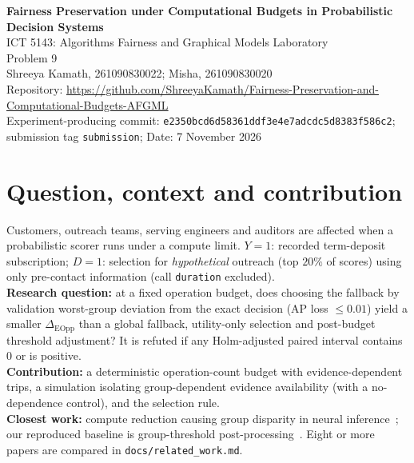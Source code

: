 \documentclass[11pt,a4paper]{article}
\newcommand{\ProjectTitle}{Fairness Preservation under Computational Budgets in Probabilistic Decision Systems}
\begin{document}
\begin{center}
{\Large\bfseries \ProjectTitle}\\[4pt]
ICT 5143: Algorithms Fairness and Graphical Models Laboratory\\
Problem 9\\
Shreeya Kamath, 261090830022; Misha, 261090830020\\
{\small Repository: \url{https://github.com/ShreeyaKamath/Fairness-Preservation-and-Computational-Budgets-AFGML}\\
Experiment-producing commit: \texttt{e2350bcd6d58361ddf3e4e7adcdc5d8383f586c2}; submission tag \texttt{submission}; Date: 7 November 2026}
\end{center}
\begin{abstract}
\noindent We ask whether a budget-aware fallback limits the fairness loss when exact inference in a nine-variable Bayesian network for pre-contact bank outreach is cut off by an operation budget. On UCI Bank Marketing (test $n=8{,}238$), fairness-aware fallback selection reproduces exact decisions (AP $0.421$, $98.3\%$ agreement) but has a larger $\Delta_{\mathrm{EOpp}}$ than the global fallback by $+0.120$ $[0.015,0.226]$; our hypothesis is refuted. Simulation shows group-dependent evidence availability drives fallback disparity. Limits: strong base-rate drift, no customer identifiers, small network.
\end{abstract}

\section{Question, context and contribution}
Customers, outreach teams, serving engineers and auditors are affected when a probabilistic scorer runs under a compute limit. $Y=1$: recorded term-deposit subscription; $D=1$: selection for \emph{hypothetical} outreach (top $20\%$ of scores) using only pre-contact information (call \texttt{duration} excluded).\\
\textbf{Research question:} at a fixed operation budget, does choosing the fallback by validation worst-group deviation from the exact decision (AP loss $\le0.01$) yield a smaller $\Delta_{\mathrm{EOpp}}$ than a global fallback, utility-only selection and post-budget threshold adjustment? It is refuted if any Holm-adjusted paired interval contains $0$ or is positive.\\
\textbf{Contribution:} a deterministic operation-count budget with evidence-dependent trips, a simulation isolating group-dependent evidence availability (with a no-dependence control), and the selection rule.\\
\textbf{Closest work:} compute reduction causing group disparity in neural inference~\cite{closest}; our reproduced baseline is group-threshold post-processing~\cite{method}. Eight or more papers are compared in \texttt{docs/related\_work.md}.
\end{document}
